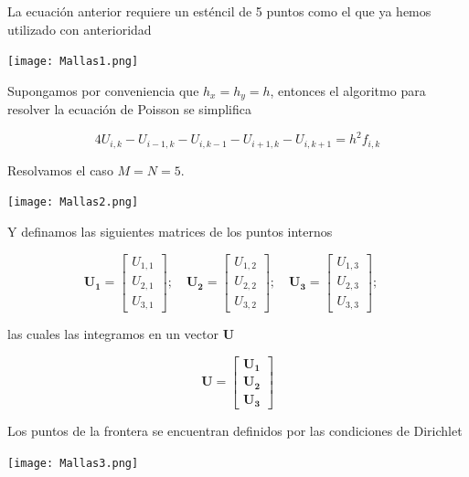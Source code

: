 \documentclass[12pt]{article}
\begin{document}
La ecuación anterior requiere un esténcil de 5 puntos como el que ya hemos utilizado con anterioridad

\begin{center}
    \texttt{[image: Mallas1.png]}
\end{center}

Supongamos por conveniencia que $h_x=h_y=h$, entonces el algoritmo para resolver la ecuación de Poisson se simplifica

\begin{equation*}
4 U_{i,k} - U_{i-1,k} - U_{i,k-1} - U_{i+1,k}
- U_{i,k+1} = h^2 f_{i,k}
\end{equation*}

Resolvamos el caso $M=N=5$.

\begin{center}
    \texttt{[image: Mallas2.png]}
\end{center}

Y definamos las siguientes matrices de los puntos internos

\begin{equation*}
\mathbf{U_1} = \begin{bmatrix}
U_{1,1} \\ U_{2,1} \\ U_{3,1}
\end{bmatrix}; \quad
\mathbf{U_2} = \begin{bmatrix}
U_{1,2} \\ U_{2,2} \\ U_{3,2} 
\end{bmatrix}; \quad
\mathbf{U_3} = \begin{bmatrix}
U_{1,3} \\ U_{2,3} \\ U_{3,3}
\end{bmatrix}; \quad
\end{equation*}

las cuales las integramos en un vector $\mathbf{U}$

\begin{equation*}
\mathbf{U} = \begin{bmatrix}
\mathbf{U_{1}} \\ \mathbf{U_{2}} \\ \mathbf{U_{3}}
\end{bmatrix}
\end{equation*}

Los puntos de la frontera se encuentran definidos por las condiciones de Dirichlet

\begin{center}
    \texttt{[image: Mallas3.png]}
\end{center}
\end{document}
